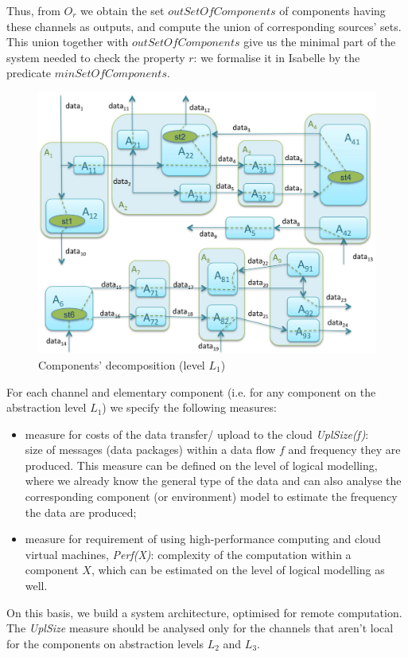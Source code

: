 Thus, from $O_{r}$ we obtain the set $outSetOfComponents$ of components having these channels as outputs, and
compute the union of corresponding sources' sets.
This union together with $outSetOfComponents$ give us  the minimal part of the system 
needed to check the property $r$: we formalise it in Isabelle  by the predicate $minSetOfComponents$.  


 

\begin{figure}[ht!]
  \begin{center}
   \includegraphics[scale=0.15]{fig/L1.pdf}
      \vspace{-2mm}
    \caption{%
    Components' decomposition (level $L_{1}$)}
    \label{fig:example_comm2}
  \end{center}
\end{figure}

 \newpage
For each channel and elementary component 
(i.e. for any component on the abstraction level $L_{1}$) we specify the following measures:
\begin{itemize}
\item
measure for costs of the data transfer/ upload to the cloud \emph{UplSize(f)}:\\
 size of  messages (data packages) within a data flow $f$ and  frequency they are produced. 
This measure can be defined on the level of logical modelling, 
where we already know the general type of the data and 
can also analyse the corresponding  component (or environment) model to estimate the frequency the data are produced;
\item
measure 
for requirement of using high-performance computing and cloud virtual machines, \emph{Perf(X)}: 
complexity of the computation within a component $X$, which can be estimated on the  level of logical modelling as well.  
\end{itemize}
%
On this basis, we build a system architecture, optimised for remote computation.  
The \emph{UplSize} measure should be analysed only for the channels that aren't local for the components on abstraction levels $L_{2}$ and $L_{3}$.

